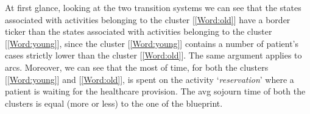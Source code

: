 At first glance, looking at the two transition systems we can see that the states associated with activities belonging to the cluster [\ref{Word:old}] have a border ticker than the states associated with activities belonging to the cluster [\ref{Word:young}], since the cluster [\ref{Word:young}] contains a number of patient's cases strictly lower than the cluster [\ref{Word:old}]. The same argument applies to arcs. Moreover, we can see that the most of time, for both the clusters [\ref{Word:young}] and [\ref{Word:old}], is spent on the activity `\textit{reservation}' where a patient is waiting for the healthcare provision. %
 The avg sojourn time of both the clusters is equal (more or less) to the one of the blueprint.
